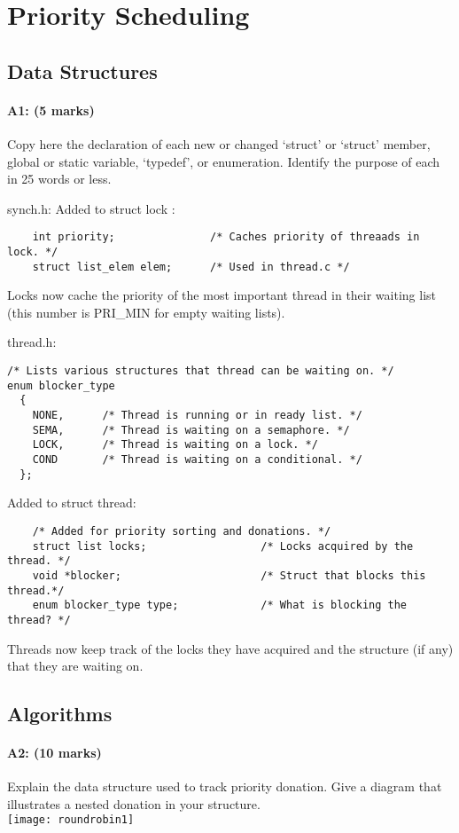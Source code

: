 \section{Priority Scheduling}
\subsection{Data Structures}
\paragraph{A1: (5 marks)}
Copy here the declaration of each new or changed `struct' or `struct' member, global or static variable, `typedef', or enumeration.  Identify the purpose of each in 25 words or less.

synch.h:
Added to struct lock :
\begin{verbatim}
    int priority;               /* Caches priority of threaads in lock. */
    struct list_elem elem;      /* Used in thread.c */
\end{verbatim}
Locks now cache the priority of the most important thread in their waiting list (this number is PRI\_MIN for empty waiting lists).

thread.h:
\begin{verbatim}
/* Lists various structures that thread can be waiting on. */
enum blocker_type
  {
    NONE,      /* Thread is running or in ready list. */
    SEMA,      /* Thread is waiting on a semaphore. */
    LOCK,      /* Thread is waiting on a lock. */
    COND       /* Thread is waiting on a conditional. */
  };
\end{verbatim}

Added to struct thread:
\begin{verbatim}
    /* Added for priority sorting and donations. */
    struct list locks;                  /* Locks acquired by the thread. */
    void *blocker;                      /* Struct that blocks this thread.*/
    enum blocker_type type;             /* What is blocking the thread? */
\end{verbatim}
Threads now keep track of the locks they have acquired and the structure (if any) that they are waiting on.


\subsection{Algorithms}
\paragraph{A2: (10 marks)}
Explain the data structure used to track priority donation. Give a diagram that illustrates a nested donation in your structure.
\\
\texttt{[image: roundrobin1]}

